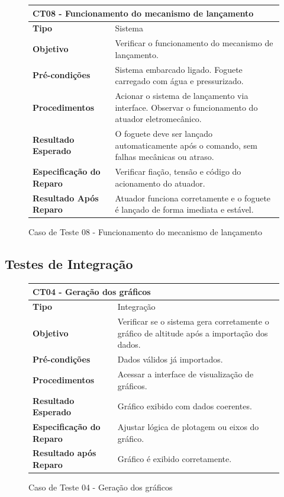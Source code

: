 \begin{figure}[H]
    \centering
\begin{longtable}{|p{}|p{}|}
\hline
\multicolumn{2}{|l|}{\textbf{CT08 - Funcionamento do mecanismo de lançamento}} \\
\hline
\textbf{Tipo} & Sistema \\
\hline
\textbf{Objetivo} & Verificar o funcionamento do mecanismo de lançamento. \\
\hline
\textbf{Pré-condições} & Sistema embarcado ligado.  Foguete carregado com água e pressurizado. \\
\hline
\textbf{Procedimentos} & Acionar o sistema de lançamento via interface.  Observar o funcionamento do atuador eletromecânico. \\
\hline
\textbf{Resultado Esperado} & O foguete deve ser lançado automaticamente após o comando, sem falhas mecânicas ou atraso. \\
\hline
\textbf{Especificação do Reparo} & Verificar fiação, tensão e código do acionamento do atuador. \\
\hline
\textbf{Resultado Após Reparo} & Atuador funciona corretamente e o foguete é lançado de forma imediata e estável. \\
\hline
\end{longtable}
\caption{Caso de Teste 08 - Funcionamento do mecanismo de lançamento}
\label{fig_ct08_funcionamento_mecanismo_lancamento}
\end{figure}

\subsection*{Testes de Integração}

\begin{figure}[H]
    \centering
\begin{longtable}{|p{}|p{}|}
\hline
\multicolumn{2}{|l|}{\textbf{CT04 - Geração dos gráficos}} \\
\hline
\textbf{Tipo} & Integração \\
\hline
\textbf{Objetivo} & Verificar se o sistema gera corretamente o gráfico de altitude após a importação dos dados. \\
\hline
\textbf{Pré-condições} & Dados válidos já importados. \\
\hline
\textbf{Procedimentos} & Acessar a interface de visualização de gráficos. \\
\hline
\textbf{Resultado Esperado} & Gráfico exibido com dados coerentes. \\
\hline
\textbf{Especificação do Reparo} & Ajustar lógica de plotagem ou eixos do gráfico. \\
\hline
\textbf{Resultado após Reparo} & Gráfico é exibido corretamente. \\
\hline
\end{longtable}
\caption{Caso de Teste 04 - Geração dos gráficos}
\label{fig_ct04_geracao_graficos}
\end{figure}

